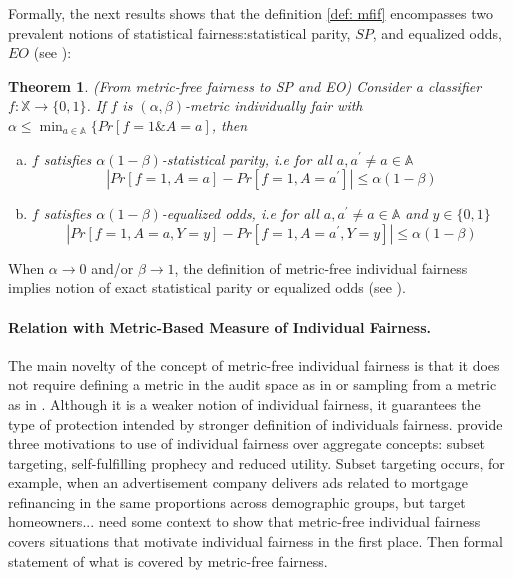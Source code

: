 \documentclass{article}
\newtheorem{thm}{Theorem}[section]
\begin{document}
\bigskip
Formally, the next results shows that the definition \ref{def: mfif} encompasses two prevalent notions of statistical fairness:statistical parity, $SP$, and equalized odds, $EO$ (see \cite{hardt2016equality}):

\begin{thm}(From metric-free fairness to SP and EO)
\label{thm: SP}
Consider a classifier $f: \mathbb{X} \rightarrow \{0, 1\}$.  If $f$ is $(\alpha,\beta)$-metric individually fair with $\alpha \leq \min_{a\in \mathbb{A}}\{Pr[f=1 \& A=a]$, then 
\begin{enumerate}[(a)]
    \item $f$ satisfies $\alpha(1-\beta)$-statistical parity, i.e for all $a, a^{'}\neq a \in \mathbb{A}$
$$ |Pr[f=1, A=a] - Pr[f=1, A=a^{'}]| \leq \alpha(1-\beta)$$
    \item $f$ satisfies $\alpha(1-\beta)$-equalized odds, i.e for all $a, a^{'}\neq a \in \mathbb{A}$ and $y\in\{0,1\}$
$$ |Pr[f=1, A=a, Y=y] - Pr[f=1, A=a^{'}, Y=y]| \leq \alpha(1-\beta)$$
\end{enumerate}
\end{thm}

When $\alpha \rightarrow 0$ and/or $\beta\rightarrow 1$, the definition of metric-free individual fairness implies notion of  exact statistical parity or equalized odds (see \cite{hardt2016equality}).

\paragraph{Relation with Metric-Based Measure of Individual Fairness.}
The main novelty of the concept of metric-free individual fairness is that it does not require defining a metric in the audit space as in \cite{dwork2012fairness} or sampling from a metric as in \cite{kim2018fairness}. Although it is a weaker notion of individual fairness, it guarantees the type of protection intended by stronger definition of individuals fairness. \cite{dwork2012fairness} provide three motivations to use of individual fairness over aggregate concepts: subset targeting,  self-fulfilling prophecy and reduced utility. Subset targeting occurs, for example, when an advertisement company delivers ads related to mortgage refinancing in the same proportions across demographic groups, but target homeowners... need some context to show that metric-free individual fairness covers situations that motivate individual fairness in the first place.  Then formal statement of what is covered by metric-free fairness.
\end{document}

